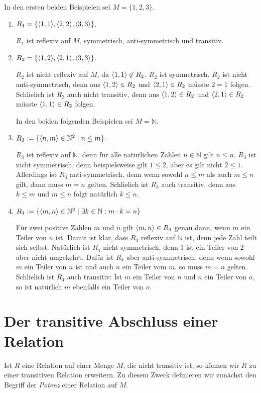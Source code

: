 \examples 
In den ersten beiden Beispielen sei $M = \{1,2,3\}$.
\begin{enumerate}
\item $R_1 = \{ \pair(1,1), \pair(2,2), \pair(3,3) \}$.

      $R_1$ ist reflexiv auf $M$, symmetrisch, anti-symmetrisch und transitiv.
\item $R_2 = \{ \pair(1,2), \pair(2,1), \pair(3,3) \}$.

      $R_2$ ist nicht reflexiv auf $M$, da $\pair(1,1) \not\in R_2$.
      $R_2$ ist symmetrisch. 
      $R_2$ ist nicht anti-symmetrisch, denn aus $\pair(1,2) \in R_2$ und 
      $\pair(2,1) \in R_2$ m\"{u}sste $2=1$ folgen.
      Schlie\3lich ist $R_2$ auch nicht transitiv, denn aus $\pair(1,2) \in R_2$ und 
      $\pair(2,1) \in R_2$ m\"{u}sste $\pair(1,1) \in R_2$ folgen.

      In den beiden folgenden Beispielen sei $M = \mathbb{N}$.
\item $R_3 := \{ \pair(n,m) \in \mathbb{N}^2 \mid n \leq m \}$.

      $R_3$ ist reflexiv auf $\mathbb{N}$, denn f\"{u}r alle nat\"{u}rlichen Zahlen $n \in \mathbb{N}$ gilt 
      $n \leq n$.  $R_3$ ist nicht symmetrisch, denn beispielsweise gilt
      $1 \leq 2$, aber es gilt nicht $2 \leq 1$.  Allerdings ist $R_3$ anti-symmetrisch,
      denn wenn sowohl $n \leq m$ als auch $m \leq n$ gilt, dann muss  $m = n$ gelten.
      Schlie\3lich ist $R_3$ auch transitiv, denn aus $k \leq m$ und $m \leq n$ folgt
      nat\"{u}rlich $k \leq n$.
\item $R_4 := \{ \pair(m,n) \in \mathbb{N}^2 \mid \exists k\in \mathbb{N}: m\cdot k = n \}$

      F\"{u}r zwei positive Zahlen $m$ und $n$ gilt $\pair(m,n) \in R_4$ genau dann, wenn $m$ ein
      Teiler von $n$ ist.  Damit ist klar, dass $R_4$ reflexiv auf $\mathbb{N}$ ist, denn jede Zahl 
      teilt sich selbst.  Nat\"{u}rlich ist $R_4$ nicht symmetrisch, denn $1$ ist ein Teiler
      von $2$ aber nicht umgekehrt.  Daf\"{u}r ist $R_4$ aber anti-symmetrisch, denn wenn 
      sowohl $m$ ein Teiler von $n$ ist und auch $n$ ein Teiler vom $m$, so muss $m = n$
      gelten.  Schlie\3lich ist $R_4$ auch transitiv: Ist $m$ ein Teiler von $n$ und
      $n$ ein Teiler von $o$, so ist nat\"{u}rlich $m$ ebenfalls ein Teiler von $o$.
\end{enumerate}

\section{Der transitive Abschluss einer Relation}
Ist $R$ eine Relation auf einer Menge $M$, die nicht transitiv ist, so k\"{o}nnen wir $R$ zu einer
transitiven Relation erweitern.  Zu diesem Zweck  definieren wir zun\"{a}chst den Begriff der \emph{Potenz}
einer Relation auf $M$.


